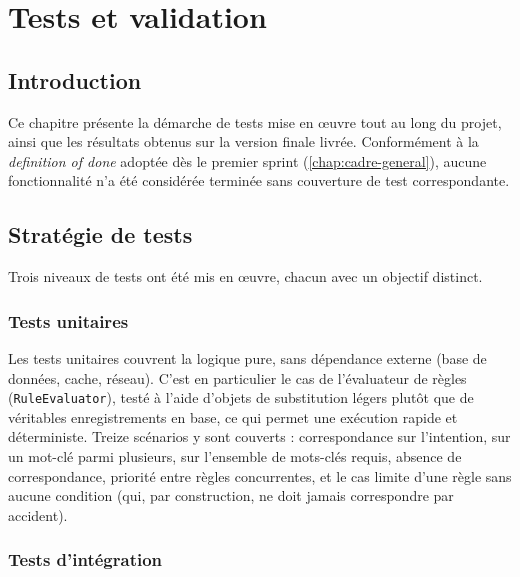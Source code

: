 \chapter{Tests et validation}
\label{chap:tests}

\section*{Introduction}

Ce chapitre présente la démarche de tests mise en \oe{}uvre tout au long du projet, ainsi que les résultats obtenus sur la version finale livrée. Conformément à la \emph{definition of done} adoptée dès le premier sprint (\cref{chap:cadre-general}), aucune fonctionnalité n'a été considérée terminée sans couverture de test correspondante.

\section{Stratégie de tests}

Trois niveaux de tests ont été mis en \oe{}uvre, chacun avec un objectif distinct.

\subsection{Tests unitaires}

Les tests unitaires couvrent la logique pure, sans dépendance externe (base de données, cache, réseau). C'est en particulier le cas de l'évaluateur de règles (\texttt{RuleEvaluator}), testé à l'aide d'objets de substitution légers plutôt que de véritables enregistrements en base, ce qui permet une exécution rapide et déterministe. Treize scénarios y sont couverts : correspondance sur l'intention, sur un mot-clé parmi plusieurs, sur l'ensemble de mots-clés requis, absence de correspondance, priorité entre règles concurrentes, et le cas limite d'une règle sans aucune condition (qui, par construction, ne doit jamais correspondre par accident).

\subsection{Tests d'intégration}

